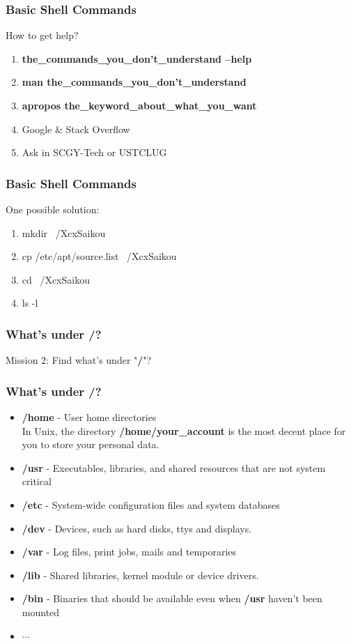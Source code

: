 \documentclass[11pt]{beamer}
\begin{document}
\begin{frame}
\frametitle{Basic Shell Commands}
How to get help?
\begin{enumerate}
\item \textbf{the\_commands\_you\_don't\_understand --help}
\item \textbf{man the\_commands\_you\_don't\_understand}
\item \textbf{apropos the\_keyword\_about\_what\_you\_want}
\item Google \& Stack Overflow
\item Ask in SCGY-Tech or USTCLUG
\end{enumerate}
\end{frame}

\begin{frame}
\frametitle{Basic Shell Commands}
One possible solution:
\begin{enumerate}
\item mkdir ~/XcxSaikou
\item cp /etc/apt/source.list ~/XcxSaikou
\item cd ~/XcxSaikou
\item ls -l
\end{enumerate}
\end{frame}


\begin{frame}
\frametitle{What's under \textbf{/}?}
Mission 2: Find what's under "\textbf{/}"?
\end{frame}

\begin{frame}
\frametitle{What's under \textbf{/}?}
\begin{itemize}
\item \textbf{/home} - User home directories\\
In Unix, the directory \textbf{/home/your\_account} is the most decent place for you to store your personal data.
\item \textbf{/usr} - Executables, libraries, and shared resources that are not system critical
\item \textbf{/etc} - System-wide configuration files and system databases
\item \textbf{/dev} - Devices, such as hard disks, ttys and displays.
\item \textbf{/var} - Log files, print jobs, mails and temporaries
\item \textbf{/lib} - Shared libraries, kernel module or device drivers.
\item \textbf{/bin} - Binaries that should be available even when \textbf{/usr} haven't been mounted
\item $\cdots$
\end{itemize}
\end{frame}
\end{document}
